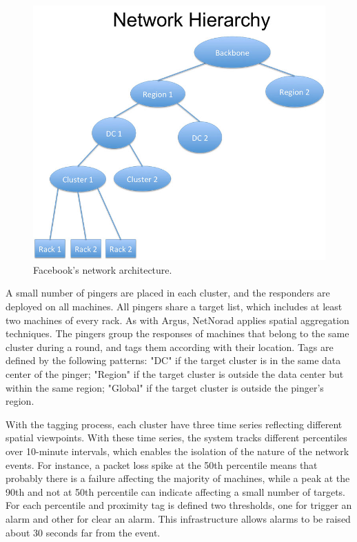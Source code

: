 \begin{figure}[H]
    \centering
    \includegraphics[width=1.0\textwidth]{./figures/literature_review/netnorad_network_architecture.jpg}
    \caption{Facebook's network architecture.}
    \label{fig:netnorad_network_architecture.jpg}
\end{figure}%

A small number of pingers are placed in each cluster, and the responders are
deployed on all machines. All pingers share a target list, which includes
at least two machines of every rack.
As with Argus, NetNorad applies spatial aggregation techniques.
The pingers group the responses of machines that belong to the same cluster
during a round, and tags them according with their location.
Tags are defined by the following patterns:
"DC" if the target cluster is in the same data center of the pinger;
"Region" if the target cluster is outside the
data center but within the same region;
"Global" if the target cluster is outside the pinger's
region.

With the tagging process, each cluster have three time series reflecting
different spatial viewpoints. With these time series, the system tracks
different percentiles over 10-minute
intervals, which enables the isolation of the
nature of the network events. For instance, a packet loss spike at the
50th percentile means that probably there is a failure affecting the majority of
machines, while a peak at the 90th and not at 50th
percentile can indicate  affecting a small
number of targets. For each percentile and proximity tag is defined two
thresholds, one for trigger an alarm and other for clear an alarm. This
infrastructure allows alarms to be raised about 30 seconds far from the event.

